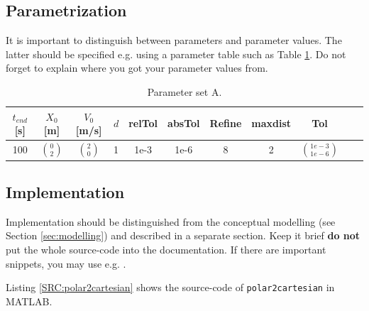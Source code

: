 \documentclass[a4paper,11pt]{scrartcl}
\begin{document}
\subsection{Parametrization}
It is important to distinguish between parameters and parameter values. The latter should be specified e.g. using a parameter table such as 
Table \ref{tab:ParA}. Do not forget to explain where you got your parameter values from.
\begin{table}[!h]
{\small%
\newcommand{\mc}[3]{\multicolumn{#1}{#2}{#3}}
\begin{center}
\begin{tabular}{|c|c|c|c|c|c|c|c|c|c|c|}
 \hline
 $t_{end}$ [s] & $X_0$ [m]    & $V_0$ [m/s]  & $d$ & relTol & absTol & Refine & maxdist & Tol\\
 \hline              
      100      & $\binom{0}{2}$ & $\binom{2}{0}$ &  1  & 1e-3   &  1e-6  &    8   &     2   &  $\binom{1e-3}{1e-6}$ \\
 \hline
\end{tabular}
\end{center}
}%
\caption{Parameter set A.}
\label{tab:ParA}
\end{table}

\subsection{Implementation}

Implementation should be distinguished from the conceptual modelling (see Section \ref{sec:modelling}) and described in a separate section. Keep it brief \textbf{do not} put the whole source-code into the documentation. If there are important snippets, you may use e.g. \verb||.

 

Listing \ref{SRC:polar2cartesian} shows the source-code of \verb|polar2cartesian| in MATLAB. 
 
\end{document}
